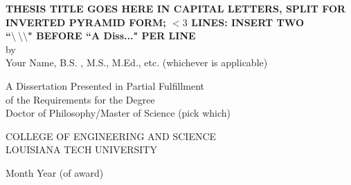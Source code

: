 \begin{center}
\vspace*{48pt}
{ \normalsize \textbf{
THESIS TITLE GOES HERE IN CAPITAL LETTERS, SPLIT FOR \\  %
INVERTED PYRAMID FORM; $<3$ LINES: INSERT TWO \\      %
``$\setminus \ \setminus \setminus$" BEFORE ``A Diss..." PER LINE
}} \\
by\\
Your Name, B.S. , M.S., M.Ed., etc. (whichever is applicable)

\vspace{132pt}
\begin{singlespace}%
A Dissertation Presented in Partial Fulfillment \\
of the Requirements for the Degree \\
Doctor of Philosophy/Master of Science (pick which) \\

\vspace{96pt}

COLLEGE OF ENGINEERING AND SCIENCE\\
LOUISIANA TECH UNIVERSITY\\

\vspace{96pt}

Month Year (of award)
\end{singlespace}
\end{center}



